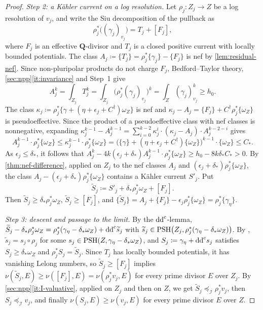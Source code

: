 \documentclass[11pt,a4paper]{amsart}
\newcommand{\lessI}{\preceq_{\mathcal I}}
\theoremstyle{definition}
\begin{document}
\begin{proof}
\emph{Step 2: a K\"ahler current on a log resolution.} Let
$\rho_j\colon Z_j\to Z$ be a log resolution of $v_j$, and write the Siu
decomposition of the pullback as
\[
  \rho_j^*\bigl((\gamma_j)_{v_j}\bigr)=T_j+[F_j],
\]
where $F_j$ is an effective $\mathbf Q$-divisor and $T_j$ is a closed
positive current with locally bounded potentials. The class
$A_j\coloneqq\{T_j\}=\rho_j^*\{\gamma_j\}-\{F_j\}$ is nef by
\cref{lem:residual-nef}. Since non-pluripolar products do not charge
$F_j$, Bedford--Taylor theory, \cref{sec:npp}\ref{it:invariance} and
Step~1 give
\[
  A_j^k=\int_{Z_j}T_j^k
  =\int_{Z_j}\bigl(\rho_j^*(\gamma_j)_{v_j}\bigr)^k
  =\int_Z(\gamma_j)_{v_j}^k\ge h_0.
\]
The class
$\kappa_j\coloneqq\rho_j^*\{\gamma+(\eta+\epsilon_j+C^\dagger)\omega_Z\}$ is nef
and $\kappa_j-A_j=\{F_j\}+C^\dagger\rho_j^*\{\omega_Z\}$ is pseudoeffective.
Since the product of a pseudoeffective class with nef classes is
nonnegative, expanding
$\kappa_j^{k-1}-A_j^{k-1}=\sum_{i=0}^{k-2}\kappa_j^i\cdot(\kappa_j-A_j)\cdot A_j^{k-2-i}$
gives
\[
  A_j^{k-1}\cdot\rho_j^*\{\omega_Z\}
  \le \kappa_j^{k-1}\cdot\rho_j^*\{\omega_Z\}
  =\bigl(\{\gamma\}+(\eta+\epsilon_j+C^\dagger)\{\omega_Z\}\bigr)^{k-1}
   \cdot\{\omega_Z\}
  \le C_*.
\]
As $\epsilon_j\le\delta_*$, it follows that
$A_j^k-4k(\epsilon_j+\delta_*)A_j^{k-1}\cdot\rho_j^*\{\omega_Z\}
\ge h_0-8k\delta_*C_*>0$. By \cref{thm:nef-difference}, applied on $Z_j$
to the nef classes $A_j$ and $(\epsilon_j+\delta_*)\rho_j^*\{\omega_Z\}$,
the class $A_j-(\epsilon_j+\delta_*)\rho_j^*\{\omega_Z\}$ contains a
K\"ahler current $S'_j$. Put
\[
  \widetilde S_j\coloneqq S'_j+\delta_*\rho_j^*\omega_Z+[F_j].
\]
Then $\widetilde S_j\ge\delta_*\rho_j^*\omega_Z$,
$\widetilde S_j\ge[F_j]$, and
$\{\widetilde S_j\}=A_j+\{F_j\}-\epsilon_j\rho_j^*\{\omega_Z\}
=\rho_j^*\{\gamma_\eta\}$.

\emph{Step 3: descent and passage to the limit.} By the $\mathrm{dd}^{\mathrm{c}}$-lemma,
$\widetilde S_j-\delta_*\rho_j^*\omega_Z
=\rho_j^*(\gamma_\eta-\delta_*\omega_Z)+\mathrm{dd}^{\mathrm{c}}\widetilde s_j$ with
$\widetilde s_j\in\mathrm{PSH}\bigl(Z_j,\rho_j^*(\gamma_\eta-\delta_*\omega_Z)\bigr)$.
By \cite[Proposition~1.5.3]{XiaSGPT}, $\widetilde s_j=s_j\circ\rho_j$ for
some $s_j\in\mathrm{PSH}(Z,\gamma_\eta-\delta_*\omega_Z)$, and
$S_j\coloneqq\gamma_\eta+\mathrm{dd}^{\mathrm{c}} s_j$ satisfies $S_j\ge\delta_*\omega_Z$ and
$\rho_j^*S_j=\widetilde S_j$. Since $T_j$ has locally bounded potentials,
it has vanishing Lelong numbers, so $\widetilde S_j\ge[F_j]$ implies
$\nu(\widetilde S_j,E)\ge\nu([F_j],E)=\nu(\rho_j^*v_j,E)$ for every prime
divisor $E$ over $Z_j$. By \cref{sec:npp}\ref{it:I-valuative}, applied on
$Z_j$ and then on $Z$, we get $\widetilde S_j\lessI\rho_j^*v_j$, then
$S_j\lessI v_j$, and finally $\nu(S_j,E)\ge\nu(v_j,E)$ for every prime
divisor $E$ over $Z$.


\end{proof}
\end{document}
